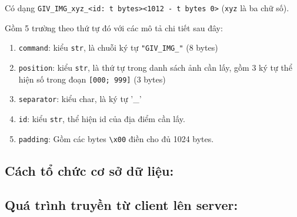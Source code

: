 \begin{enumerate}
\begin{enumerate}
Có dạng \texttt{GIV{\_}IMG{\_}xyz{\_}<id: t bytes><1012 - t bytes 0>} (\texttt{xyz} là ba chữ số).

Gồm 5 trường theo thứ tự đó với các mô tả chi tiết sau đây:

\begin{enumerate}
\item \texttt{command}: kiểu \texttt{str}, là chuỗi ký tự \texttt{"GIV{\_}IMG{\_}"} (8 bytes)
\item \texttt{position}: kiểu \texttt{str}, là thứ tự trong danh sách ảnh cần lấy, gồm 3 ký tự thể hiện số trong đoạn \texttt{[000; 999]} (3 bytes)
\item \texttt{separator}: kiểu char, là ký tự '{\_}'
\item \texttt{id}: kiểu \texttt{str}, thể hiện id của địa điểm cần lấy.
\item \texttt{padding}: Gồm các bytes \texttt{\textbackslash x00} điền cho đủ 1024 bytes.
\end{enumerate}
\end{enumerate}
\end{enumerate}
\subsection{Cách tổ chức cơ sở dữ liệu:}
\subsection{Quá trình truyền từ client lên server:}
